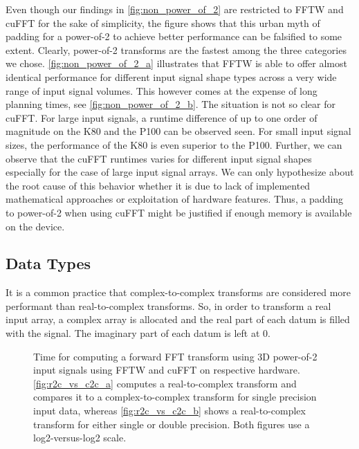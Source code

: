 Even though our findings in \cref{fig:non_power_of_2} are restricted to FFTW and cuFFT for the sake of simplicity, the figure shows that this urban myth of padding for a power-of-2 to achieve better performance can be falsified to some extent. Clearly, power-of-2 transforms are the fastest among the three categories we chose. \cref{fig:non_power_of_2_a} illustrates that FFTW is able to offer almost identical performance for different input signal shape types across a very wide range of input signal volumes. This however comes at the expense of long planning times, see \cref{fig:non_power_of_2_b}. The situation is not so clear for cuFFT. For large input signals, a runtime difference of up to one order of magnitude on the K80 and the P100 can be observed seen. For small input signal sizes, the performance of the K80 is even superior to the P100. Further, we can observe that the cuFFT runtimes varies for different input signal shapes especially for the case of large input signal arrays. We can only hypothesize about the root cause of this behavior whether it is due to lack of implemented mathematical approaches or exploitation of hardware features. Thus, a padding to power-of-2 when using cuFFT might be justified if enough memory is available on the device.     

\subsection{Data Types}
\label{ssec:data_types}

It is a common practice that complex-to-complex transforms are considered more performant than real-to-complex transforms. So, in order to transform a real input array, a complex array is allocated and the real part of each datum is filled with the signal. The imaginary part of each datum is left at $0$.

\begin{figure}[!tbp]
  \centering
  \hfill
  \caption{Time for computing a forward FFT transform using 3D power-of-2 input signals using FFTW and cuFFT on respective hardware. \cref{fig:r2c_vs_c2c_a} computes a real-to-complex transform and compares it to a complex-to-complex transform for single precision input data, whereas \cref{fig:r2c_vs_c2c_b} shows a real-to-complex transform for either single or double precision. Both figures use a log2-versus-log2 scale.}
  \label{fig:r2c_vs_c2c}
\end{figure}

